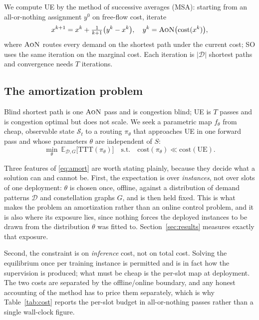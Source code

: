 \documentclass[journal]{IEEEtran}
\newcommand{\cost}{\mathrm{cost}}
\newcommand{\TTT}{\mathrm{TTT}}
\newcommand{\AoN}{\textsc{AoN}}
\begin{document}
We compute UE by the method of successive averages (MSA): starting from an
all-or-nothing assignment $y^{0}$ on free-flow cost, iterate
\begin{equation}
x^{k+1}=x^{k}+\tfrac{1}{k+1}\big(y^{k}-x^{k}\big),\quad
y^{k}=\AoN\big(\cost(x^{k})\big),
\label{eq:msa}
\end{equation}
where $\AoN$ routes every demand on the shortest path under the current cost; SO uses
the same iteration on the marginal cost. Each iteration is $|\mathcal{D}|$
shortest paths and convergence needs $T$ iterations.

\subsection{The amortization problem}
Blind shortest path is one $\AoN$ pass and is congestion blind; UE is $T$ passes and is
congestion optimal but does not scale. We seek a parametric map $f_\theta$ from cheap,
observable state $\mathcal{S}_t$ to a routing $\pi_\theta$ that approaches UE in one
forward pass and whose parameters $\theta$ are independent of $S$:
\begin{equation}
\min_{\theta}\ \mathbb{E}_{\mathcal{D},G}\big[\TTT(\pi_\theta)\big]
\quad\text{s.t.}\quad \mathrm{cost}(\pi_\theta)\ll \mathrm{cost}(\mathrm{UE}).
\label{eq:amort}
\end{equation}

Three features of \eqref{eq:amort} are worth stating plainly, because they decide what a solution
can and cannot be. First, the expectation is over \emph{instances}, not over slots of one
deployment: $\theta$ is chosen once, offline, against a distribution of demand patterns
$\mathcal{D}$ and constellation graphs $G$, and is then held fixed. This is what makes the problem
an amortization rather than an online control problem, and it is also where its exposure lies,
since nothing forces the deployed instances to be drawn from the distribution $\theta$ was fitted
to. Section~\ref{sec:results} measures exactly that exposure.

Second, the constraint is on \emph{inference} cost, not on total cost. Solving the equilibrium once
per training instance is permitted and is in fact how the supervision is produced; what must be
cheap is the per-slot map at deployment. The two costs are separated by the offline/online
boundary, and any honest accounting of the method has to price them separately, which is why
Table~\ref{tab:cost} reports the per-slot budget in all-or-nothing passes rather than a single
wall-clock figure.
\end{document}
